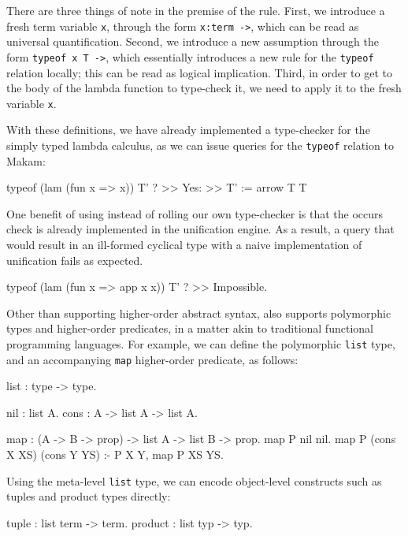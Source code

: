 \documentclass[format=acmlarge,review,anonymous]{acmart}\settopmatter{printfolios=true}
\begin{document}
There are three things of note in the premise of the rule. First, we introduce a fresh term variable
\texttt{x}, through the form \texttt{x:term ->}, which can be read as universal quantification. Second, we
introduce a new assumption through the form \texttt{typeof x T ->}, which essentially introduces a new rule
for the \texttt{typeof} relation locally; this can be read as logical implication. Third, in order to get
to the body of the lambda function to type-check it, we need to apply it to the fresh variable \texttt{x}.

With these definitions, we have already implemented a type-checker for the simply typed lambda
calculus, as we can issue queries for the \texttt{typeof} relation to Makam:

\begin{codequote}
typeof (lam (fun x => x)) T' ?
>> Yes:
>> T' := arrow T T
\end{codequote}

One benefit of using \lamprolog instead of rolling our own type-checker is that the occurs check is
already implemented in the unification engine. As a result, a query that would result in an
ill-formed cyclical type with a naive implementation of unification fails as expected.

\begin{codequote}
typeof (lam (fun x => app x x)) T' ?
>> Impossible.
\end{codequote}

Other than supporting higher-order abstract syntax, \lamprolog also supports polymorphic types and
higher-order predicates, in a matter akin to traditional functional programming languages. For
example, we can define the polymorphic \texttt{list} type, and an accompanying \texttt{map}
higher-order predicate, as follows:

\begin{codequote}
list : type -> type.

nil : list A.
cons : A -> list A -> list A.

map : (A -> B -> prop) -> list A -> list B -> prop.
map P nil nil.
map P (cons X XS) (cons Y YS) :- P X Y, map P XS YS.
\end{codequote}

Using the meta-level \texttt{list} type, we can encode object-level constructs such as tuples and product
types directly:

\begin{codequote}
tuple : list term -> term.
product : list typ -> typ.
\end{codequote}
\end{document}
